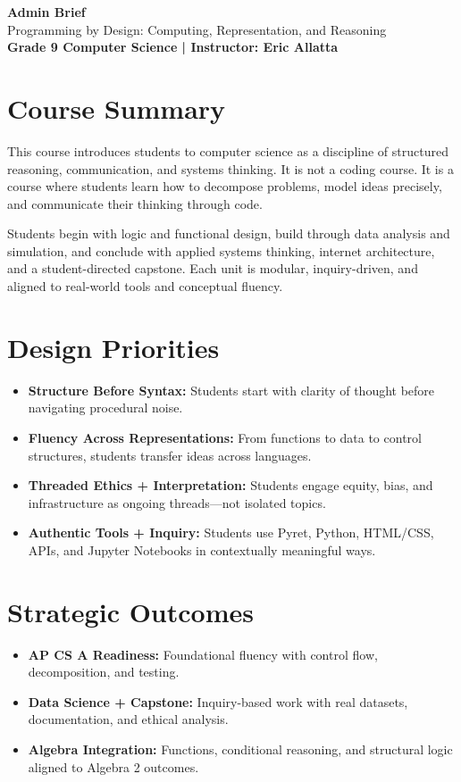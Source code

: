 \documentclass[11pt]{article}
\begin{document}
\begin{center}
  {\LARGE \textbf{Admin Brief}} \\[0.25em]
  {\large Programming by Design: Computing, Representation, and Reasoning} \\[0.5em]
  \textbf{Grade 9 Computer Science \quad | \quad Instructor: Eric Allatta}
\end{center}

\section*{Course Summary}
This course introduces students to computer science as a discipline of structured reasoning, communication, and systems thinking. It is not a coding course. It is a course where students learn how to decompose problems, model ideas precisely, and communicate their thinking through code.

Students begin with logic and functional design, build through data analysis and simulation, and conclude with applied systems thinking, internet architecture, and a student-directed capstone. Each unit is modular, inquiry-driven, and aligned to real-world tools and conceptual fluency.

\section*{Design Priorities}
\begin{itemize}[leftmargin=*]
  \item \textbf{Structure Before Syntax:} Students start with clarity of thought before navigating procedural noise.
  \item \textbf{Fluency Across Representations:} From functions to data to control structures, students transfer ideas across languages.
  \item \textbf{Threaded Ethics + Interpretation:} Students engage equity, bias, and infrastructure as ongoing threads—not isolated topics.
  \item \textbf{Authentic Tools + Inquiry:} Students use Pyret, Python, HTML/CSS, APIs, and Jupyter Notebooks in contextually meaningful ways.
\end{itemize}

\section*{Strategic Outcomes}
\begin{itemize}[leftmargin=*]
  \item \textbf{AP CS A Readiness:} Foundational fluency with control flow, decomposition, and testing.
  \item \textbf{Data Science + Capstone:} Inquiry-based work with real datasets, documentation, and ethical analysis.
  \item \textbf{Algebra Integration:} Functions, conditional reasoning, and structural logic aligned to Algebra 2 outcomes.
\end{itemize}
\end{document}
